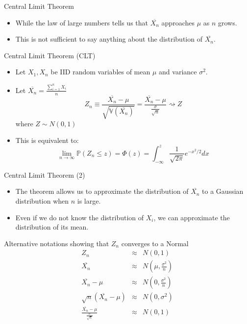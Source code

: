 \documentclass[handout]{beamer}
\begin{document}
\begin{frame}{Central Limit Theorem}
\scriptsize{
\begin{itemize}
 \item  While the law of large numbers tells us that  $\overline{X_{n}}$ approaches $\mu$ as $n$ grows.
 \item This is not sufficient to say anything about the distribution of  $\overline{X_{n}}$.
\end{itemize}

\begin{block}{Central Limit Theorem (CLT)}
\begin{itemize}
 \item Let $X_1, X_n$ be IID random variables of mean $\mu$ and variance $\sigma^2$.
 \item Let $\overline{X_{n}}=\frac{\sum_{i=1}^{n} X_i}{n}$
\begin{displaymath}
 Z_{n} \equiv \frac{\overline{X_{n}}-\mu}{\sqrt{\mathbb{V}(\overline{X_{n}})}}=\frac{\overline{X_{n}}-\mu}{\frac{\sigma}{\sqrt{n}}}  \rightsquigarrow Z
\end{displaymath}
where $Z\sim N(0,1)$
\item This is equivalent to:
\begin{displaymath}
 \lim_{n\rightarrow \infty} \mathbb{P}(Z_{n} \leq z) = \Phi(z) = \int_{-\infty}^{z}\frac{1}{\sqrt{2\pi}}e^{-x^2/2}dx
\end{displaymath}
\end{itemize}
\end{block}


} 
\end{frame}

\begin{frame}{Central Limit Theorem (2)}
\begin{itemize}
 \item The theorem allows us to approximate the distribution of $\overline{X_{n}}$ to a Gaussian distribution when $n$ is large. 
 \item Even if we do not know the distribution of $X_{i}$, we can approximate the distribution of its mean.
\end{itemize}


\scriptsize{
\begin{block}{Alternative notations showing that $Z_{n}$ converges to a Normal}
\begin{eqnarray*}
  Z_n  &\approx &N(0,1)     \nonumber \\
  \overline{X_{n}} & \approx & N \left(\mu, \frac{\sigma^2}{n} \right)   \nonumber \\
  \overline{X_{n}}-\mu & \approx & N \left(0, \frac{\sigma^2}{n} \right)   \nonumber \\
  \sqrt{n}(\overline{X_{n}}-\mu) & \approx & N (0,\sigma^2) \nonumber \\
  \frac{\overline{X_{n}}-\mu}{\frac{\sigma}{\sqrt{n}}} & \approx & N (0,1) \nonumber \\
\end{eqnarray*}


\end{block}


 }
\end{frame}
\end{document}
